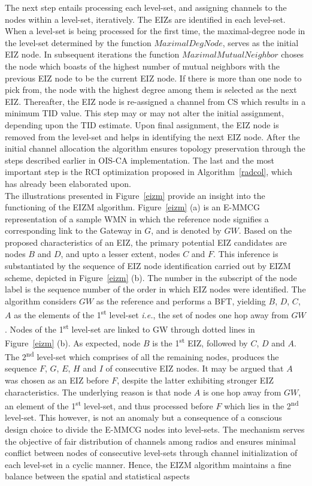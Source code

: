 \documentclass[conference]{IEEEtran}
\begin{document}
The next step entails processing each level-set, and assigning channels to the nodes within a level-set, iteratively. The EIZs are identified in each level-set. When a level-set is being processed for the first time, the maximal-degree node in the level-set determined by the function $MaximalDegNode$, serves as the initial EIZ node. In subsequent iterations the function $MaximalMutualNeighbor$ choses the node which boasts of the highest number of mutual neighbors with the previous EIZ node to be the current EIZ node. If there is more than one node to pick from, the node with the highest degree among them is selected as the next EIZ. Thereafter, the EIZ node is re-assigned a channel from CS which results in a minimum TID value. This step may or may not alter the initial assignment, depending upon the TID estimate. Upon final assignment, the EIZ node is removed from the level-set and helps in identifying the next EIZ node. After the initial channel allocation the algorithm ensures topology preservation through 
the steps described earlier in OIS-CA implementation. The last and the most important step is the RCI optimization proposed in Algorithm~\ref{radcol}, which has already been elaborated upon.\\
The illustrations presented in Figure~\ref{eizm} provide an insight into the functioning of the EIZM algorithm. Figure~\ref{eizm} (a) is an E-MMCG representation of a sample WMN in which the reference node signifies a corresponding link to the Gateway in $G$, and is denoted by $GW$. Based on the proposed characteristics of an EIZ, the primary potential EIZ candidates are nodes $B$ and $D$, and upto a lesser extent, nodes $C$ and $F$. This inference is substantiated by the sequence of EIZ node identification carried out by EIZM scheme, depicted in Figure~\ref{eizm} (b). The number in the subscript of the node label is the sequence number of the order in which EIZ nodes were identified. The algorithm considers $GW$ as the reference and performs a BFT, yielding {$B$, $D$, $C$, $A$} as the elements of the 1\textsuperscript{st} level-set \emph{i.e.}, the set of nodes one hop away from $GW$. Nodes of the 1\textsuperscript{st} level-set are linked to GW through dotted lines in Figure~\ref{eizm} (b). As expected, 
node $B$ is the 
1\textsuperscript{st} EIZ, followed by $C$, $D$ and $A$. The 2\textsuperscript{nd} level-set which comprises of all the remaining nodes, produces the sequence $F$, $G$, $E$, $H$ and $I$ of consecutive EIZ nodes. It may be argued that $A$ was chosen as an EIZ before $F$, despite the latter exhibiting stronger EIZ characteristics. The underlying reason is that node $A$ is one hop away from $GW$, an element of the 1\textsuperscript{st} level-set, and thus processed before $F$ which lies in the 2\textsuperscript{nd} level-set. This however, is not an anomaly but a consequence of a conscious design choice to divide the E-MMCG nodes into level-sets. The mechanism serves the objective of fair distribution of channels among radios and ensures minimal conflict between nodes of consecutive level-sets through channel initialization of each level-set in a cyclic manner. Hence, the EIZM algorithm maintains a fine balance between the spatial and statistical aspects 
\end{document}
